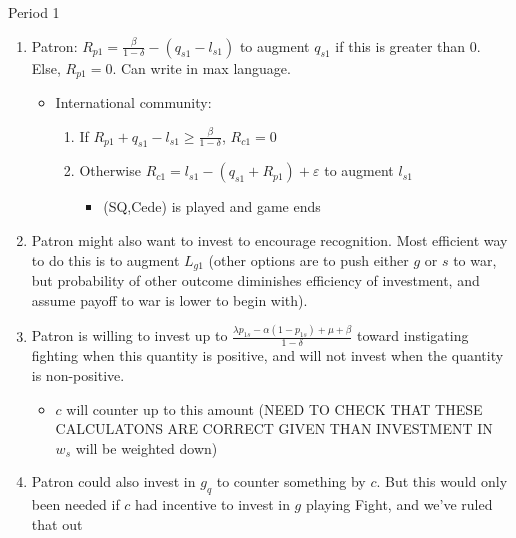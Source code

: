 \documentclass[12pt]{article}
\newcommand{\ve}{\varepsilon}
\newcommand{\de}{\delta}
\begin{document}
Period 1
\begin{enumerate}
	\item Patron: $R_{p1} = \frac{\beta}{1-\de} - \left(q_{s1} - l_{s1}\right)$ to augment $q_{s1}$ if this is greater than 0. Else, $R_{p1} = 0$. Can write in max language.
		\begin{itemize}
			\item International community: 
				\begin{enumerate}
					\item If $R_{p1} + q_{s1} - l_{s1} \geq \frac{\beta}{1-\de}$, $R_{c1} =0$
					\item Otherwise $R_{c1} = l_{s1} - \left(q_{s1} + R_{p1} \right) + \ve$ to augment $l_{s1}$
						\begin{itemize}
							\item (SQ,Cede) is played and game ends
						\end{itemize}
				\end{enumerate}
		\end{itemize}	
	\item Patron might also want to invest to encourage recognition. Most efficient way to do this is to augment $L_{g1}$ (other options are to push either $g$ or $s$ to war, but probability of other outcome diminishes efficiency of investment, and assume payoff to war is lower to begin with).	
	\item Patron is willing to invest up to $\frac{\lambda p_{1s} - \alpha (1-p_{1s}) + \mu + \beta}{1 - \de}$ toward instigating fighting when this quantity is positive, and will not invest when the quantity is non-positive.
		\begin{itemize}
			\item $c$ will counter up to this amount (NEED TO CHECK THAT THESE CALCULATONS ARE CORRECT GIVEN THAN INVESTMENT IN $w_s$ will be weighted down)
		\end{itemize}
	\item Patron could also invest in $g_q$ to counter something by $c$. But this would only been needed if $c$ had incentive to invest in $g$ playing Fight, and we've ruled that out
\end{enumerate}
\end{document}
